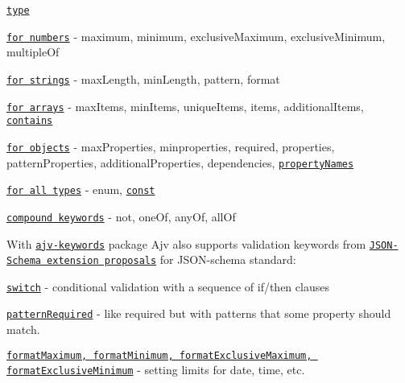 \begin{DoxyItemize}
\item \href{https://github.com/epoberezkin/ajv/blob/master/KEYWORDS.md#type}{\tt type}
\item \href{https://github.com/epoberezkin/ajv/blob/master/KEYWORDS.md#keywords-for-numbers}{\tt for numbers} -\/ maximum, minimum, exclusive\+Maximum, exclusive\+Minimum, multiple\+Of
\item \href{https://github.com/epoberezkin/ajv/blob/master/KEYWORDS.md#keywords-for-strings}{\tt for strings} -\/ max\+Length, min\+Length, pattern, format
\item \href{https://github.com/epoberezkin/ajv/blob/master/KEYWORDS.md#keywords-for-arrays}{\tt for arrays} -\/ max\+Items, min\+Items, unique\+Items, items, additional\+Items, \href{https://github.com/epoberezkin/ajv/blob/master/KEYWORDS.md#contains}{\tt contains}
\item \href{https://github.com/epoberezkin/ajv/blob/master/KEYWORDS.md#keywords-for-objects}{\tt for objects} -\/ max\+Properties, minproperties, required, properties, pattern\+Properties, additional\+Properties, dependencies, \href{https://github.com/epoberezkin/ajv/blob/master/KEYWORDS.md#propertynames}{\tt property\+Names}
\item \href{https://github.com/epoberezkin/ajv/blob/master/KEYWORDS.md#keywords-for-all-types}{\tt for all types} -\/ enum, \href{https://github.com/epoberezkin/ajv/blob/master/KEYWORDS.md#const}{\tt const}
\item \href{https://github.com/epoberezkin/ajv/blob/master/KEYWORDS.md#compound-keywords}{\tt compound keywords} -\/ not, one\+Of, any\+Of, all\+Of
\end{DoxyItemize}

With \href{https://github.com/epoberezkin/ajv-keywords}{\tt ajv-\/keywords} package Ajv also supports validation keywords from \href{https://github.com/json-schema/json-schema/wiki/v5-Proposals}{\tt J\+S\+O\+N-\/\+Schema extension proposals} for J\+S\+O\+N-\/schema standard\+:


\begin{DoxyItemize}
\item \href{https://github.com/epoberezkin/ajv/blob/master/KEYWORDS.md#switch-proposed}{\tt switch} -\/ conditional validation with a sequence of if/then clauses
\item \href{https://github.com/epoberezkin/ajv/blob/master/KEYWORDS.md#patternrequired-proposed}{\tt pattern\+Required} -\/ like {\ttfamily required} but with patterns that some property should match.
\item \href{https://github.com/epoberezkin/ajv/blob/master/KEYWORDS.md#formatmaximum--formatminimum-and-exclusiveformatmaximum--exclusiveformatminimum-proposed}{\tt format\+Maximum, format\+Minimum, format\+Exclusive\+Maximum, format\+Exclusive\+Minimum} -\/ setting limits for date, time, etc.
\end{DoxyItemize}

